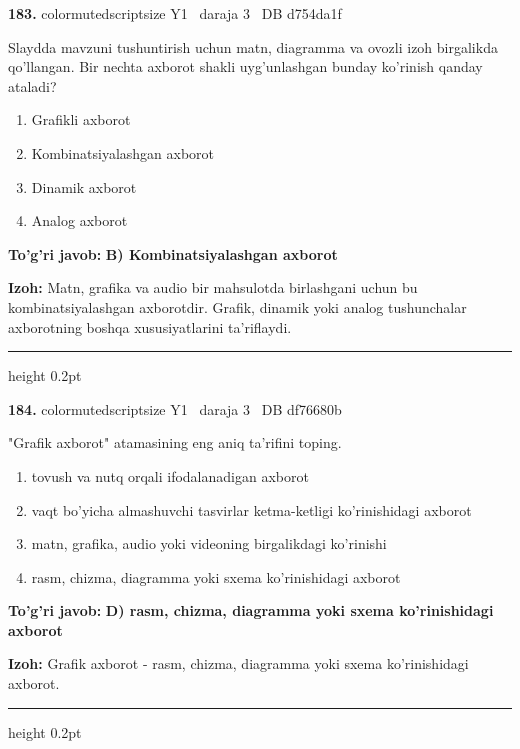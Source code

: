 \documentclass[10pt,a4paper,oneside]{article}
\begin{document}
\noindent\textbf{\color{ink}183.}  {color{muted}scriptsize Y1 \textbullet\ daraja 3 \textbullet\ DB d754da1f}
\par
Slaydda mavzuni tushuntirish uchun matn, diagramma va ovozli izoh birgalikda qo'llangan. Bir nechta axborot shakli uyg'unlashgan bunday ko'rinish qanday ataladi?
\begin{enumerate}[label=\Alph*),leftmargin=9mm]
\item Grafikli axborot
\item Kombinatsiyalashgan axborot
\item Dinamik axborot
\item Analog axborot
\end{enumerate}
\begin{tcolorbox}[enhanced,breakable,colback=teal!4,colframe=teal!50!black,boxrule=0.5pt,arc=1.1mm,left=3mm,right=3mm,top=1.7mm,bottom=1.7mm,before skip=2mm,after skip=2mm]
\textbf{\color{teal}To'g'ri javob:} \textbf{B) Kombinatsiyalashgan axborot}
\par\smallskip
\textbf{Izoh:} Matn, grafika va audio bir mahsulotda birlashgani uchun bu kombinatsiyalashgan axborotdir. Grafik, dinamik yoki analog tushunchalar axborotning boshqa xususiyatlarini ta'riflaydi.
\end{tcolorbox}
\vspace{2mm}\hrule height 0.2pt \vspace{3mm}

\noindent\textbf{\color{ink}184.}  {color{muted}scriptsize Y1 \textbullet\ daraja 3 \textbullet\ DB df76680b}
\par
"Grafik axborot" atamasining eng aniq ta'rifini toping.
\begin{enumerate}[label=\Alph*),leftmargin=9mm]
\item tovush va nutq orqali ifodalanadigan axborot
\item vaqt bo'yicha almashuvchi tasvirlar ketma-ketligi ko'rinishidagi axborot
\item matn, grafika, audio yoki videoning birgalikdagi ko'rinishi
\item rasm, chizma, diagramma yoki sxema ko'rinishidagi axborot
\end{enumerate}
\begin{tcolorbox}[enhanced,breakable,colback=teal!4,colframe=teal!50!black,boxrule=0.5pt,arc=1.1mm,left=3mm,right=3mm,top=1.7mm,bottom=1.7mm,before skip=2mm,after skip=2mm]
\textbf{\color{teal}To'g'ri javob:} \textbf{D) rasm, chizma, diagramma yoki sxema ko'rinishidagi axborot}
\par\smallskip
\textbf{Izoh:} Grafik axborot - rasm, chizma, diagramma yoki sxema ko'rinishidagi axborot.
\end{tcolorbox}
\vspace{2mm}\hrule height 0.2pt \vspace{3mm}
\end{document}
